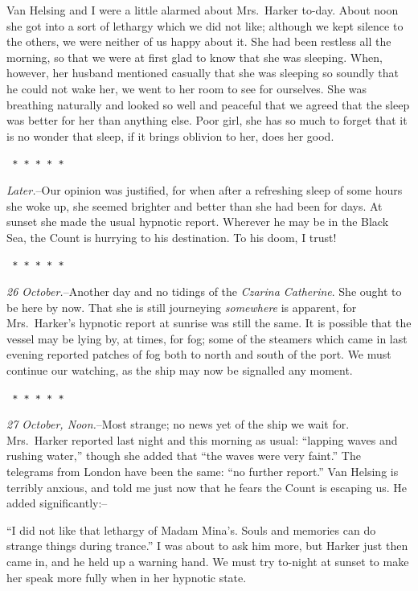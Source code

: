 \documentclass[12pt,openright]{book}
\begin{document}
Van Helsing and I were a little alarmed about Mrs. Harker to-day. About noon she got into a sort of lethargy which we did not like; although we kept silence to the others, we were neither of us happy about it. She had been restless all the morning, so that we were at first glad to know that she was sleeping. When, however, her husband mentioned casually that she was sleeping so soundly that he could not wake her, we went to her room to see for ourselves. She was breathing naturally and looked so well and peaceful that we agreed that the sleep was better for her than anything else. Poor girl, she has so much to forget that it is no wonder that sleep, if it brings oblivion to her, does her good.

\texttt{   *       *       *       *       *}

\textit{Later.}–Our opinion was justified, for when after a refreshing sleep of some hours she woke up, she seemed brighter and better than she had been for days. At sunset she made the usual hypnotic report. Wherever he may be in the Black Sea, the Count is hurrying to his destination. To his doom, I trust!

\texttt{   *       *       *       *       *}

\textit{26 October.}–Another day and no tidings of the \textit{Czarina Catherine}. She ought to be here by now. That she is still journeying \textit{somewhere} is apparent, for Mrs. Harker’s hypnotic report at sunrise was still the same. It is possible that the vessel may be lying by, at times, for fog; some of the steamers which came in last evening reported patches of fog both to north and south of the port. We must continue our watching, as the ship may now be signalled any moment.

\texttt{   *       *       *       *       *}

\textit{27 October, Noon.}–Most strange; no news yet of the ship we wait for. Mrs. Harker reported last night and this morning as usual: “lapping waves and rushing water,” though she added that “the waves were very faint.” The telegrams from London have been the same: “no further report.” Van Helsing is terribly anxious, and told me just now that he fears the Count is escaping us. He added significantly:–

“I did not like that lethargy of Madam Mina’s. Souls and memories can do strange things during trance.” I was about to ask him more, but Harker just then came in, and he held up a warning hand. We must try to-night at sunset to make her speak more fully when in her hypnotic state.
\end{document}
